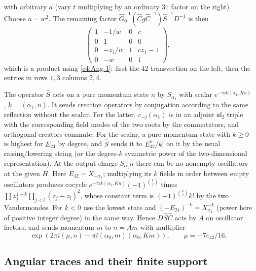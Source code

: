 with arbitrary \(a\) (vary \(t\) multiplying by an ordinary \(31\) factor on the right). Choose \(a=w^2\). The remaining factor \(\widehat G_0^{-1}(\widehat Cg\widehat C^{-1})\widehat S^{-1}D^{-1}\) is then
\[
 \begin{pmatrix}1&-1/w&0&c\\0&1&0&0\\0&-z_1/w&1&c z_1-1\\0&-w&0&1\end{pmatrix},
\]
which is a product using \eqref{c4:Ang-1}: first the \(42\) transvection on the left, then the entries in rows \(1,3\) columns \(2,4\).

The operator \(\widehat S\) acts on a pure momentum state \(n\) by \(S_{\alpha_1}\) with scalar \(e^{-\pi i k(\alpha_1,K n)}\), \(k=(\alpha_1,n)\). It sends creation operators by conjugation according to the same reflection without the scalar. For the latter, \(c_{-j}(\alpha_1)\) is in an adjoint \(\mathfrak{sl}_2\) triple with the corresponding field modes of the two roots by the commutators, and orthogonal creators commute. For the scalar, a pure momentum state with \(k\ge0\) is highest for \(E_{24}\) by degree, and \(\widehat S\) sends it to \(E_{42}^k/k!\) on it by the usual raising/lowering string (or the degree-\(k\) symmetric power of the two-dimensional representation). At the output charge \(S_{\alpha_1}n\) there can be no nonempty oscillators at the given \(H\). Here \(E_{42}=X_{-\alpha_1}\); multiplying its \(k\) fields in order between empty oscillators produces cocycle \(e^{-\pi i k(\alpha_1,K n)}(-1)^{\binom{k}{2}}\) times
\(\prod z_j^{1-k}\prod_{j<l}(z_j-z_l)^2\), whose constant term is \((-1)^{\binom{k}{2}}k!\) by the two Vandermondes. For \(k<0\) use the lowest state and \((-E_{24})^{-k}=X_{\alpha_1}^{-k}\) (power here of positive integer degree) in the same way. Hence \(D\widehat S\widehat C\) acts by \(A\) on oscillator factors, and sends momentum \(m\) to \(n=A m\) with multiplier
\[
 \exp(2\pi i(\mu,n)-\pi i(\alpha_0,m)(\alpha_0,K m)),\qquad \mu=-7e_{42}/16 .
\]

\subsection{Angular traces and their finite support}

